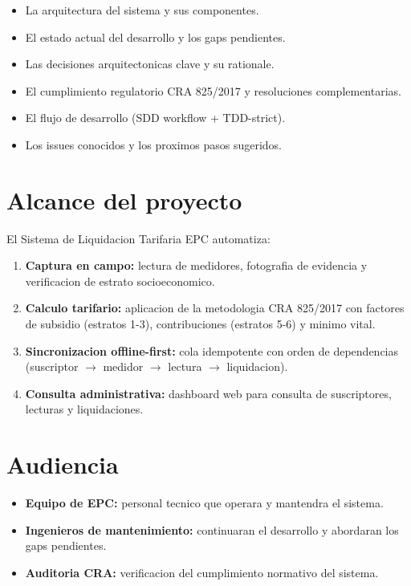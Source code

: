 \documentclass[11pt,a4paper,oneside]{report}
\begin{document}
\begin{itemize}[leftmargin=*]
    \item La arquitectura del sistema y sus componentes.
    \item El estado actual del desarrollo y los gaps pendientes.
    \item Las decisiones arquitectonicas clave y su rationale.
    \item El cumplimiento regulatorio CRA 825/2017 y resoluciones complementarias.
    \item El flujo de desarrollo (SDD workflow + TDD-strict).
    \item Los issues conocidos y los proximos pasos sugeridos.
\end{itemize}

\section{Alcance del proyecto}

El Sistema de Liquidacion Tarifaria EPC automatiza:

\begin{enumerate}[leftmargin=*]
    \item \textbf{Captura en campo:} lectura de medidores, fotografia de evidencia y verificacion de estrato socioeconomico.
    \item \textbf{Calculo tarifario:} aplicacion de la metodologia CRA 825/2017 con factores de subsidio (estratos 1-3), contribuciones (estratos 5-6) y minimo vital.
    \item \textbf{Sincronizacion offline-first:} cola idempotente con orden de dependencias (suscriptor $\to$ medidor $\to$ lectura $\to$ liquidacion).
    \item \textbf{Consulta administrativa:} dashboard web para consulta de suscriptores, lecturas y liquidaciones.
\end{enumerate}

\section{Audiencia}

\begin{itemize}[leftmargin=*]
    \item \textbf{Equipo de EPC:} personal tecnico que operara y mantendra el sistema.
    \item \textbf{Ingenieros de mantenimiento:} continuaran el desarrollo y abordaran los gaps pendientes.
    \item \textbf{Auditoria CRA:} verificacion del cumplimiento normativo del sistema.
\end{itemize}
\end{document}
